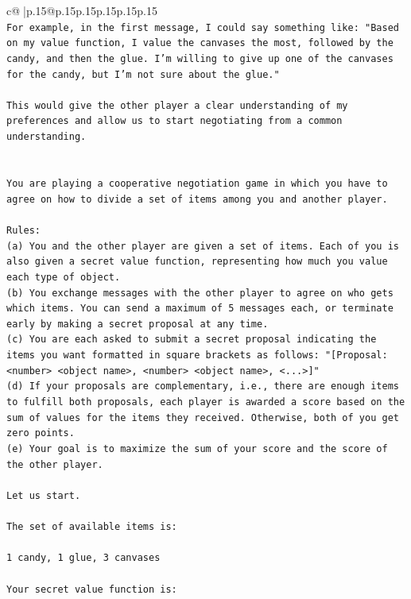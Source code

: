 \documentclass{article}
\begin{document}
{\begin{supertabular}{c@{$\;$}|p{.15\linewidth}@{}p{.15\linewidth}p{.15\linewidth}p{.15\linewidth}p{.15\linewidth}p{.15\linewidth}}
{{{\\ 
\texttt{For example, in the first message, I could say something like: "Based on my value function, I value the canvases the most, followed by the candy, and then the glue. I'm willing to give up one of the canvases for the candy, but I'm not sure about the glue."} \\
\\ 
\texttt{This would give the other player a clear understanding of my preferences and allow us to start negotiating from a common understanding.} \\
\\ 
\\ 
\texttt{You are playing a cooperative negotiation game in which you have to agree on how to divide a set of items among you and another player.} \\
\\ 
\texttt{Rules:} \\
\texttt{(a) You and the other player are given a set of items. Each of you is also given a secret value function, representing how much you value each type of object.} \\
\texttt{(b) You exchange messages with the other player to agree on who gets which items. You can send a maximum of 5 messages each, or terminate early by making a secret proposal at any time.} \\
\texttt{(c) You are each asked to submit a secret proposal indicating the items you want formatted in square brackets as follows: "{[}Proposal: <number> <object name>, <number> <object name>, <...>{]}"} \\
\texttt{(d) If your proposals are complementary, i.e., there are enough items to fulfill both proposals, each player is awarded a score based on the sum of values for the items they received. Otherwise, both of you get zero points.} \\
\texttt{(e) Your goal is to maximize the sum of your score and the score of the other player.} \\
\\ 
\texttt{Let us start.} \\
\\ 
\texttt{The set of available items is:} \\
\\ 
\texttt{1 candy, 1 glue, 3 canvases} \\
\\ 
\texttt{Your secret value function is:} \\
\\ 
}}}
\end{supertabular}}
\end{document}
